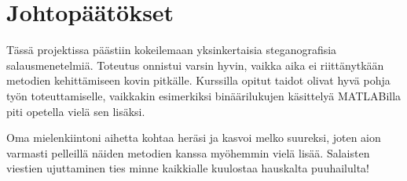 \documentclass[a4paper,11pt]{article}
\begin{document}
\section{Johtopäätökset}

Tässä projektissa päästiin kokeilemaan yksinkertaisia steganografisia salausmenetelmiä. Toteutus onnistui varsin hyvin, vaikka aika ei riittänytkään metodien kehittämiseen kovin pitkälle. Kurssilla opitut taidot olivat hyvä pohja työn toteuttamiselle, vaikkakin esimerkiksi binäärilukujen käsittelyä MATLABilla piti opetella vielä sen lisäksi.

Oma mielenkiintoni aihetta kohtaa heräsi ja kasvoi melko suureksi, joten aion varmasti pelleillä näiden metodien kanssa myöhemmin vielä lisää. Salaisten viestien ujuttaminen ties minne kaikkialle kuulostaa hauskalta puuhailulta!

\nocite{*}
\printbibliography
\end{document}
